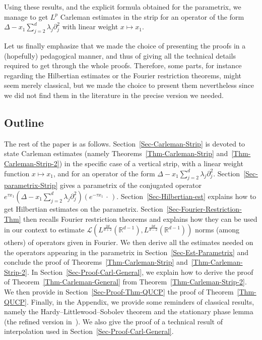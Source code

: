 \documentclass[AHL,Unicode,longabstracts]{cedram}
\newcommand{\scL}{\mathscr{L}}
\newcommand*\R{\mathbb{R}}
\begin{document}
Using these results, and the explicit formula obtained for the parametrix, we manage to get $L^p$ Carleman estimates in the strip for an operator of the form $\Delta - x_1 \sum_{j = 2}^d \lambda_j \partial_{j}^2$ with linear weight $x \mapsto x_1$.

Let us finally emphasize that we made the choice of presenting the proofs in a (hopefully) pedagogical manner, and thus of giving all the technical details required to get through the whole proofs. Therefore, some parts, for instance regarding the Hilbertian estimates or the Fourier restriction theorems, might seem merely classical, but we made the choice to present them nevertheless since we did not find them in the literature in the precise version we needed.

\subsection*{Outline} 

The rest of the paper is as follows. Section~\ref{Sec-Carleman-Strip} is devoted to state Carleman estimates (namely Theorems~\ref{Thm-Carleman-Strip} and~\ref{Thm-Carleman-Strip-2}) in the specific case of a vertical strip, with a linear weight function $x \mapsto x_1$, and for an operator of the form $\Delta - x_1 \sum_{j = 2}^d \lambda_j \partial_{j}^2$. Section~\ref{Sec-parametrix-Strip} gives a parametrix of the conjugated operator $e^{\tau x_1}(\Delta - x_1 \sum_{j = 2}^d \lambda_j \partial_{j}^2)(e^{-\tau x_1}\, \cdot \,)$. Section~\ref{Sec-Hilbertian-est} explains how to get Hilbertian estimates on the parametrix. Section~\ref{Sec-Fourier-Restriction-Thm} then recalls Fourier restriction theorems and explains how they can be used in our context to estimate $\scL(L^{\frac{2d}{d+2}}(\R^{d-1}),L^{\frac{2d}{d-2}}(\R^{d-1})) $ norms (among others) of operators given in Fourier. We then derive all the estimates needed on the operators appearing in the parametrix in Section~\ref{Sec-Est-Parametrix} and conclude the proof of Theorems~\ref{Thm-Carleman-Strip} and~\ref{Thm-Carleman-Strip-2}. In Section~\ref{Sec-Proof-Carl-General}, we explain how to derive the proof of Theorem~\ref{Thm-Carleman-General} from Theorem~\ref{Thm-Carleman-Strip-2}. We then provide in Section~\ref{Sec-Proof-Thm-QUCP} the proof of Theorem~\ref{Thm-QUCP}. Finally, in the Appendix, we provide some reminders of classical results, namely the Hardy--Littlewood--Sobolev theorem and the stationary phase lemma (the refined version in~\cite{alazard2017stationary}). We also give the proof of a technical result of interpolation used in Section~\ref{Sec-Proof-Carl-General}.
\end{document}
